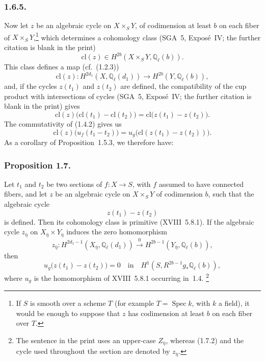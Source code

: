 \subsubsection*{1.6.5.}
Now let $z$ be an algebraic cycle on $X\times_S Y$, of codimension at least
$b$ on each fiber of $X\times_S Y$,\footnote{If $S$ is smooth over a scheme
$T$ (for example $T=\operatorname{Spec}k$, with $k$ a field), it would be
enough to suppose that $z$ has codimension at least $b$ on each fiber over
$T$.} which determines a cohomology class (SGA~5, Expos\'e~IV; the further
citation is blank in the print)
\begin{equation}\tag{1.6.6}
\mathrm{cl}(z)\in H^{2b}(X\times_S Y,\mathbb Q_\ell(b)).
\end{equation}
This class defines a map (cf.~(1.2.3))
\begin{equation}\tag{1.6.7}
\mathrm{cl}(z):H^{2d_1}(X,\mathbb Q_\ell(d_1))
\longrightarrow H^{2b}(Y,\mathbb Q_\ell(b)),
\end{equation}
and, if the cycles $z(t_1)$ and $z(t_2)$ are defined, the compatibility of
the cup product with intersections of cycles (SGA~5, Expos\'e~IV; the
further citation is blank in the print) gives
\begin{equation}\tag{1.6.8}
\mathrm{cl}(z)\bigl(\mathrm{cl}(t_1)-\mathrm{cl}(t_2)\bigr)
=\mathrm{cl}\bigl(z(t_1)-z(t_2)\bigr).
\end{equation}
The commutativity of (1.4.2) gives us
\begin{equation}\tag{1.6.9}
\mathrm{cl}(z)\bigl(u_f(t_1-t_2)\bigr)
=u_g\bigl(\mathrm{cl}(z(t_1)-z(t_2))\bigr).
\end{equation}
As a corollary of Proposition~1.5.3, we therefore have:

\subsubsection*{Proposition 1.7.}
Let $t_1$ and $t_2$ be two sections of $f:X\longrightarrow S$, with $f$
assumed to have connected fibers, and let $z$ be an algebraic cycle on
$X\times_S Y$ of codimension $b$, such that the algebraic cycle
\begin{equation}\tag{1.7.1}
z(t_1)-z(t_2)
\end{equation}
is defined.  Then its cohomology class is primitive (XVIII~5.8.1).  If the
algebraic cycle $z_{\bar\eta}$ on
$X_{\bar\eta}\times Y_{\bar\eta}$ induces the zero homomorphism
\begin{equation}\tag{1.7.2}
z_{\bar\eta}:H^{2d_1-1}(X_{\bar\eta},\mathbb Q_\ell(d_1))
\stackrel{0}{\longrightarrow}
H^{2b-1}(Y_{\bar\eta},\mathbb Q_\ell(b)),
\end{equation}
then
\begin{equation}\tag{1.7.3}
u_g\bigl(z(t_1)-z(t_2)\bigr)=0\quad\text{in}\quad
H^1(S,R^{2b-1}g_*\mathbb Q_\ell(b)),
\end{equation}
where $u_g$ is the homomorphism of XVIII~5.8.1 occurring in~1.4.
\footnote{The sentence in the print uses an upper-case $Z_{\bar\eta}$,
whereas (1.7.2) and the cycle used throughout the section are denoted by
$z_{\bar\eta}$.}

